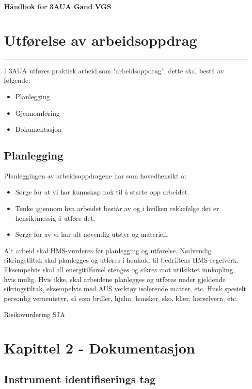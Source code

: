 \documentclass[10pt,a5paper]{article}
\begin{document}
\huge
\centerline \textbf{Håndbok for 3AUA Gand VGS} \bigskip
\normalsize
\vfil \eject
\section {Utførelse av arbeidsoppdrag}
\hrule

\vskip 1cm

I 3AUA utføres praktisk arbeid som "arbeidsoppdrag", dette skal bestå av følgende:\begin{itemize}[noitemsep]
	\item Planlegging
	\item Gjennomføring
	\item Dokumentasjon
\end{itemize}

\subsection {Planlegging}

Planleggingen av arbeidsoppdragene har som hovedhensikt å:

\begin{itemize}[noitemsep]
	\item Sørge for at vi har kunnskap nok til å starte opp arbeidet. 
	\item Tenke igjennom hva arbeidet består av og i hvilken rekkefølge det er hensiktmessig å utføre det. 
	\item Sørge for av vi har alt nøvendig utstyr og materiell. 
\end{itemize}



Alt arbeid skal HMS-vurderes før planlegging og utførelse. Nødvendig sikringstiltak skal planlegges og utføres i henhold til bedriftens HMS-regelverk. Eksempelvis skal all energitilførsel stenges og sikres mot utilsiktet innkopling, hvis mulig. Hvis ikke, skal arbeidene planlegges og utføres under gjeldende sikringstiltak, eksempelvis med AUS verktøy isolerende matter, etc. Husk spesielt personlig verneutstyr, så som briller, hjelm, hansker, sko, klær, hørselvern, etc.


\vskip 10pt 
Risikovurdering
\vskip 10pt 
SJA
\vskip 10pt 
\vskip 10pt 
\vskip 10pt 
\vskip 10pt 
\vskip 10pt 
\vfil \eject
\section{Kapittel 2 - Dokumentasjon}
\subsection{Instrument identifiserings tag} 
\end{document}
